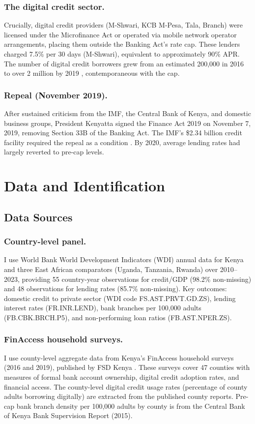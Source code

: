 \documentclass[12pt]{article}
\begin{document}
\subsubsection*{The digital credit sector.}
Crucially, digital credit providers (M-Shwari, KCB M-Pesa, Tala, Branch) were licensed under the Microfinance Act or operated via mobile network operator arrangements, placing them outside the Banking Act's rate cap. These lenders charged 7.5\% per 30 days (M-Shwari), equivalent to approximately 90\% APR. The number of digital credit borrowers grew from an estimated 200,000 in 2016 to over 2 million by 2019 \citep{finaccess2019}, contemporaneous with the cap.

\subsubsection*{Repeal (November 2019).}
After sustained criticism from the IMF, the Central Bank of Kenya, and domestic business groups, President Kenyatta signed the Finance Act 2019 on November 7, 2019, removing Section 33B of the Banking Act. The IMF's \$2.34 billion credit facility required the repeal as a condition \citep{imf_kenya_2019}. By 2020, average lending rates had largely reverted to pre-cap levels.

\section{Data and Identification}

\subsection{Data Sources}

\subsubsection*{Country-level panel.}
I use World Bank World Development Indicators (WDI) annual data for Kenya and three East African comparators (Uganda, Tanzania, Rwanda) over 2010--2023, providing 55 country-year observations for credit/GDP (98.2\% non-missing) and 48 observations for lending rates (85.7\% non-missing). Key outcomes: domestic credit to private sector (WDI code FS.AST.PRVT.GD.ZS), lending interest rates (FR.INR.LEND), bank branches per 100,000 adults (FB.CBK.BRCH.P5), and non-performing loan ratios (FB.AST.NPER.ZS).

\subsubsection*{FinAccess household surveys.}
I use county-level aggregate data from Kenya's FinAccess household surveys (2016 and 2019), published by FSD Kenya \citep{finaccess2019}. These surveys cover 47 counties with measures of formal bank account ownership, digital credit adoption rates, and financial access. The county-level digital credit usage rates (percentage of county adults borrowing digitally) are extracted from the published county reports. Pre-cap bank branch density per 100,000 adults by county is from the Central Bank of Kenya Bank Supervision Report (2015).
\end{document}
